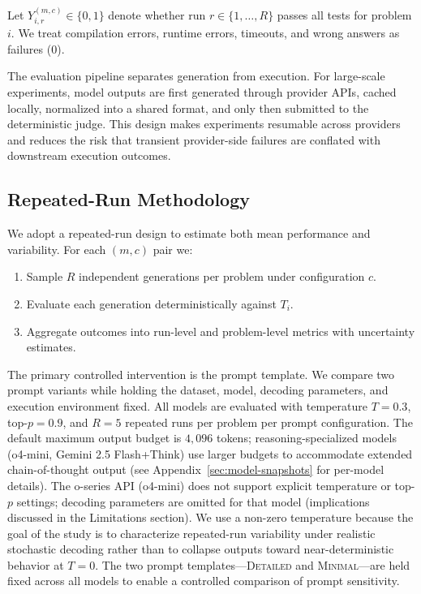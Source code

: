 \documentclass[11pt,a4paper]{article}
\begin{document}
Let $Y_{i,r}^{(m,c)} \in \{0,1\}$ denote whether run $r \in \{1,\dots,R\}$ passes all tests for problem $i$. We treat compilation errors, runtime errors, timeouts, and wrong answers as failures ($0$).

The evaluation pipeline separates generation from execution. For large-scale experiments, model outputs are first generated through provider APIs, cached locally, normalized into a shared format, and only then submitted to the deterministic judge. This design makes experiments resumable across providers and reduces the risk that transient provider-side failures are conflated with downstream execution outcomes.

\subsection{Repeated-Run Methodology}
We adopt a repeated-run design to estimate both mean performance and variability. For each $(m,c)$ pair we:
\begin{enumerate}
  \item Sample $R$ independent generations per problem under configuration $c$.
  \item Evaluate each generation deterministically against $T_i$.
  \item Aggregate outcomes into run-level and problem-level metrics with uncertainty estimates.
\end{enumerate}

The primary controlled intervention is the prompt template. We compare two prompt variants while holding the dataset, model, decoding parameters, and execution environment fixed. All models are evaluated with temperature $T=0.3$, top-$p=0.9$, and $R=5$ repeated runs per problem per prompt configuration. The default maximum output budget is $4{,}096$ tokens; reasoning-specialized models (o4-mini, Gemini 2.5 Flash+Think) use larger budgets to accommodate extended chain-of-thought output (see Appendix~\ref{sec:model-snapshots} for per-model details). The o-series API (o4-mini) does not support explicit temperature or top-$p$ settings; decoding parameters are omitted for that model (implications discussed in the Limitations section). We use a non-zero temperature because the goal of the study is to characterize repeated-run variability under realistic stochastic decoding rather than to collapse outputs toward near-deterministic behavior at $T=0$. The two prompt templates---\textsc{Detailed} and \textsc{Minimal}---are held fixed across all models to enable a controlled comparison of prompt sensitivity.
\end{document}
